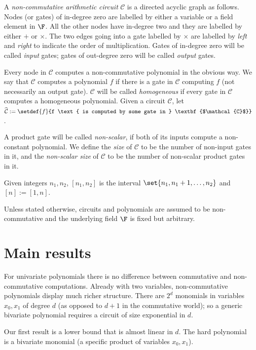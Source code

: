 \documentclass[11pt]{article}
\newcommand{\ckt}{\textbf{$\mathcal{C}$}}
\begin{document}
A \emph{non-commutative arithmetic circuit} $\ckt$ is a directed acyclic graph as follows.
Nodes (or gates) of in-degree zero are labelled by either a variable 
or a field element in $\F$.
All the other nodes have in-degree two and they are labelled by 
either $+$ or $\times$.
The two edges going into a gate labelled by $\times$ are labelled by \emph{left} and \emph{right} to indicate the order of multiplication. Gates of in-degree zero will be called \emph{input} gates; gates of out-degree zero will be called \emph{output} gates.  

Every node in $\ckt$ computes a non-commutative polynomial in the obvious way. We say that $\ckt$ computes a polynomial $f$ if there is a gate in $\ckt$ computing $f$ (not necessarily an output gate). 
$\ckt$ will be called \emph{homogeneous} if every gate in $\ckt$ computes a homogeneous polynomial. 
Given a circuit $\ckt$, let $\widehat{\ckt}:= \setdef{f}{f \text{ is computed by some gate in } \ckt}$.

A product gate will be called \emph{non-scalar}, if both of its inputs compute a non-constant polynomial. 
We define the \emph{size} of $\ckt$ to be the number of non-input gates in it, and the \emph{non-scalar size} of $\ckt$ to be the number of non-scalar product gates in it. 

Given integers $n_1,n_2$, $[n_1,n_2]$ is the interval $\set{n_1,n_1+1,\dots, n_2}$ and $[n]:=[1,n]$.  

\bigskip
{} Unless stated otherwise, circuits and polynomials are assumed to be non-commutative and the underlying field $\F$ is fixed but arbitrary.   


\section{Main results}

For univariate polynomials there is no difference between commutative and non-commutative computations.
Already with two variables, non-commutative polynomials display much richer structure.
There are $2^d$ monomials in variables $x_0,x_1$ of degree $d$ (as opposed to $d+1$ in the commutative world); so a generic bivariate polynomial requires a circuit of size exponential in $d$.  

Our first result is a lower bound that is almost linear in $d$. 
The hard polynomial is a bivariate monomial (a specific product of variables $x_0,x_1$).
 
\end{document}
